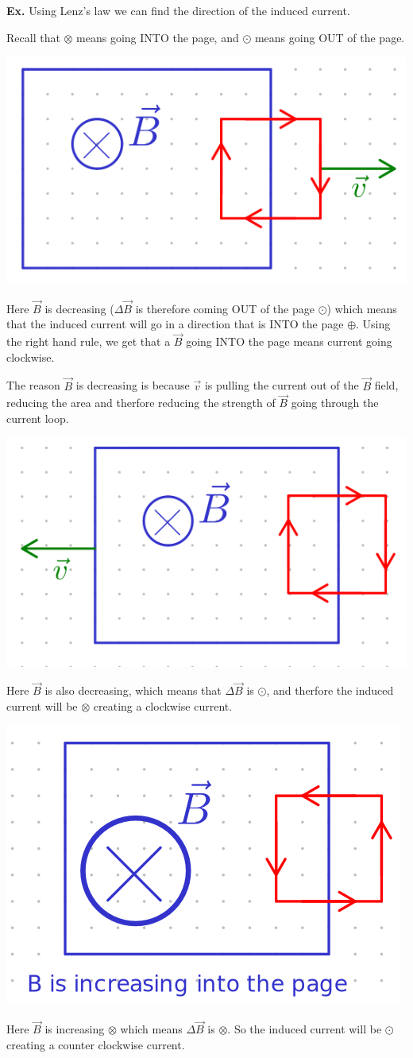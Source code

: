 \documentclass[12pt,letterpaper]{article} \usepackage{amsmath} \usepackage{graphicx} \usepackage[margin=1in]{geometry} \usepackage{longtable}  \usepackage{amssymb}
\begin{document}
	\begin{mdframed}
		\textbf{Ex. } Using Lenz's law we can find the direction of the induced current.
		
		Recall that $\otimes$ means going INTO the page, and $\odot$ means going OUT of the page.
		
		\begin{center}
			\includegraphics[width=0.3\linewidth]{lenz1}
		\end{center}
		Here $\vec B$ is decreasing ($\Delta \vec B$ is therefore coming OUT of the page $\odot$) which means that the induced current will go in a direction that is INTO the page $\oplus$. Using the right hand rule, we get that a $\vec B$ going INTO the page means current going clockwise.
		
		The reason $\vec B$ is decreasing is because $\vec v$ is pulling the current out of the $\vec B$ field, reducing the area and therfore reducing the strength of $\vec B$ going through the current loop.
		
		\begin{center}
			\includegraphics[width=0.3\linewidth]{lenz2}
		\end{center}
		Here $\vec B$ is also decreasing, which means that $\Delta \vec B$ is $\odot$, and therfore the induced current will be $\otimes$ creating a clockwise current.
		
		\begin{center}
			\includegraphics[width=0.3\linewidth]{lenz3}
		\end{center}
		Here $\vec B$ is increasing $\otimes$ which means $\Delta \vec B$ is $\otimes$. So the induced current will be $\odot$ creating a counter clockwise current.
		
	\end{mdframed}
\end{document}
